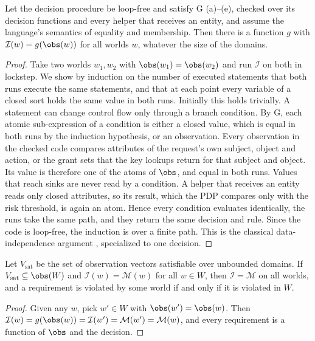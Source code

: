 \begin{lemma}\label{lem:di}
Let the decision procedure be loop-free and satisfy G (a)--(e), checked over its decision functions and every
helper that receives an entity, and assume the language's semantics of equality and membership. Then there is a
function $g$ with $\mathcal{I}(w)=g(\obs(w))$ for all worlds $w$, whatever the size of the domains.
\end{lemma}
\begin{proof}
Take two worlds $w_1,w_2$ with $\obs(w_1)=\obs(w_2)$ and run $\mathcal{I}$ on both in lockstep. We show by
induction on the number of executed statements that both runs execute the same statements, and that at each
point every variable of a closed sort holds the same value in both runs. Initially this holds trivially. A
statement can change control flow only through a branch condition. By G, each atomic sub-expression of a
condition is either a closed value, which is equal in both runs by the induction hypothesis, or an observation.
Every observation in the checked code compares attributes of the request's own subject, object and action, or
the grant sets that the key lookups return for that subject and object. Its value is therefore one of the
atoms of $\obs$, and equal in both runs. Values that reach sinks are never read by a condition. A helper that
receives an entity reads only closed attributes, so its result, which the PDP compares only with the risk
threshold, is again an atom. Hence every condition evaluates identically, the runs take the same path, and
they return the same decision and rule. Since the code is loop-free, the induction is over a finite path. This
is the classical data-independence argument \cite{wolper1986,lazic2003semantic}, specialized to one decision.
\end{proof}

\begin{theorem}\label{thm:complete}
Let $V_{\mathrm{sat}}$ be the set of observation vectors satisfiable over unbounded domains. If
$V_{\mathrm{sat}}\subseteq\obs(W)$ and $\mathcal{I}(w)=\mathcal{M}(w)$ for all $w\in W$, then
$\mathcal{I}=\mathcal{M}$ on all worlds, and a requirement is violated by some world if and only if it is violated
in $W$.
\end{theorem}
\begin{proof}
Given any $w$, pick $w'\in W$ with $\obs(w')=\obs(w)$. Then $\mathcal{I}(w)=g(\obs(w))=\mathcal{I}(w')=
\mathcal{M}(w')=\mathcal{M}(w)$, and every requirement is a function of $\obs$ and the decision.
\end{proof}

